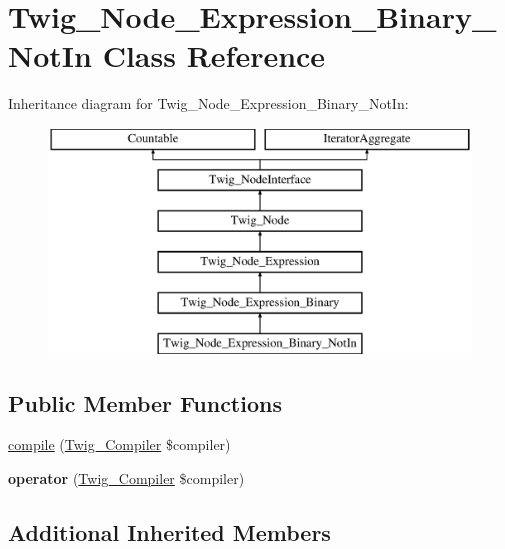 \hypertarget{classTwig__Node__Expression__Binary__NotIn}{}\section{Twig\+\_\+\+Node\+\_\+\+Expression\+\_\+\+Binary\+\_\+\+Not\+In Class Reference}
\label{classTwig__Node__Expression__Binary__NotIn}
Inheritance diagram for Twig\+\_\+\+Node\+\_\+\+Expression\+\_\+\+Binary\+\_\+\+Not\+In\+:\begin{figure}[H]
\begin{center}
\leavevmode
\includegraphics[height=6.000000cm]{classTwig__Node__Expression__Binary__NotIn}
\end{center}
\end{figure}
\subsection*{Public Member Functions}
\begin{DoxyCompactItemize}
\item 
\hyperlink{classTwig__Node__Expression__Binary__NotIn_a8b6e1b2bac0c28d67a346fb638030d6d}{compile} (\hyperlink{classTwig__Compiler}{Twig\+\_\+\+Compiler} \$compiler)
\item 
{\bfseries operator} (\hyperlink{classTwig__Compiler}{Twig\+\_\+\+Compiler} \$compiler)\hypertarget{classTwig__Node__Expression__Binary__NotIn_afade143b39c7bafe83359beaef862fa6}{}\label{classTwig__Node__Expression__Binary__NotIn_afade143b39c7bafe83359beaef862fa6}

\end{DoxyCompactItemize}
\subsection*{Additional Inherited Members}


